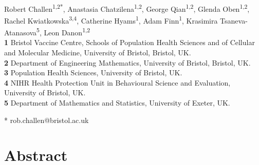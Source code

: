 \documentclass[10pt,letterpaper]{article}
\begin{document}
\vspace*{0.2in}

\begin{flushleft}
{\Large
\textbf{} 
}
\newline
\\
Robert Challen\textsuperscript{1,2*},
Anastasia Chatzilena\textsuperscript{1,2},
George Qian\textsuperscript{1,2},
Glenda Oben\textsuperscript{1,2},
Rachel Kwiatkowska\textsuperscript{3,4},
Catherine Hyams\textsuperscript{1},
Adam Finn\textsuperscript{1},
Krasimira Tsaneva-Atanasova\textsuperscript{5},
Leon Danon\textsuperscript{1,2}
\\
\bigskip
\textbf{1} Bristol Vaccine Centre, Schools of Population Health Sciences and of Cellular and Molecular Medicine, University of Bristol, Bristol, UK.\\
\textbf{2} Department of Engineering Mathematics, University of Bristol, Bristol, UK.\\
\textbf{3} Population Health Sciences, University of Bristol, UK.\\
\textbf{4} NIHR Health Protection Unit in Behavioural Science and Evaluation, University of Bristol, UK.\\
\textbf{5} Department of Mathematics and Statistics, University of Exeter, UK.\\
\bigskip

* rob.challen@bristol.ac.uk

\end{flushleft}
\section*{Abstract}
\end{document}
